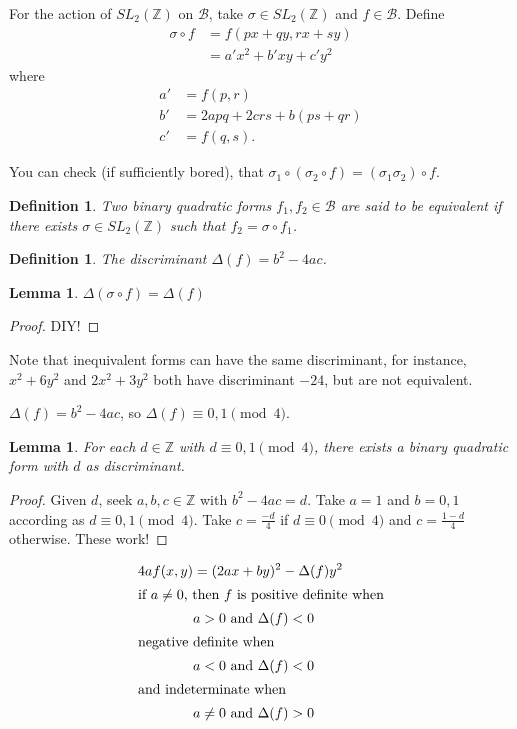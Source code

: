 \documentclass{notes}
\theoremstyle{plain}
\newtheorem{definition}[theorem]{Definition}
\newtheorem{lemma}[theorem]{Lemma}
\begin{document}
For the action of $SL_2(\mathbb{Z})$ on $\mathcal{B}$, take $\sigma
\in SL_2(\mathbb{Z})$ and $f \in \mathcal{B}$.  Define
\begin{align*}
  \sigma\circ f &= f(px+qy,rx+sy) \\
  &= a'x^2+b'xy+c'y^2
\end{align*}
where
\begin{align*}
  a' &= f(p,r) \\
  b' &= 2apq+2crs+b(ps+qr) \\
  c' &= f(q,s).
\end{align*} 

You can check (if sufficiently bored), that $\sigma_1 \circ (\sigma_2
\circ f) = (\sigma_1\sigma_2) \circ f$.

\begin{definition}
  Two binary quadratic forms $f_1, f_2 \in \mathcal{B}$ are said to be
  equivalent if there exists $\sigma \in SL_2(\mathbb{Z})$ such that
  $f_2 = \sigma \circ f_1$.
\end{definition}

\begin{definition}
  The discriminant $\Delta(f) = b^2-4ac$.
\end{definition}

\begin{lemma}
  $\Delta(\sigma \circ f) = \Delta(f)$
\end{lemma}

\begin{proof}
  DIY!
\end{proof}

Note that inequivalent forms can have the same discriminant, for
instance, $x^2+6y^2$ and $2x^2 + 3y^2$ both have discriminant $-24$,
but are not equivalent.

$\Delta(f) = b^2 - 4ac$, so $\Delta(f) \equiv 0,1 \pmod{4}$.

\begin{lemma}
  For each $d \in \mathbb{Z}$ with $d \equiv 0,1 \pmod{4}$, there
  exists a binary quadratic form with $d$ as discriminant.
\end{lemma}

\begin{proof}
  Given $d$, seek $a,b,c \in \mathbb{Z}$ with $b^2 - 4ac = d$.  Take
  $a=1$ and $b = 0,1$ according as $d \equiv 0,1 \pmod{4}$.  Take
  $c=\frac{-d}{4}$ if $d \equiv 0 \pmod{4}$ and $c=\frac{1-d}{4}$
  otherwise.  These work!
\end{proof}

\begin{align*}
  4af(x,y) &= (2ax+by)^2 - \Delta(f)y^2 \\
  \intertext{if $a \ne 0$, then $f$ is positive definite when}
  & a > 0 \text{ and } \Delta(f) < 0 \\
  \intertext{negative definite when}
  & a < 0 \text{ and } \Delta(f) < 0 \\
  \intertext{and indeterminate when} & a \ne 0 \text{ and } \Delta(f)
  > 0
\end{align*}
\end{document}
